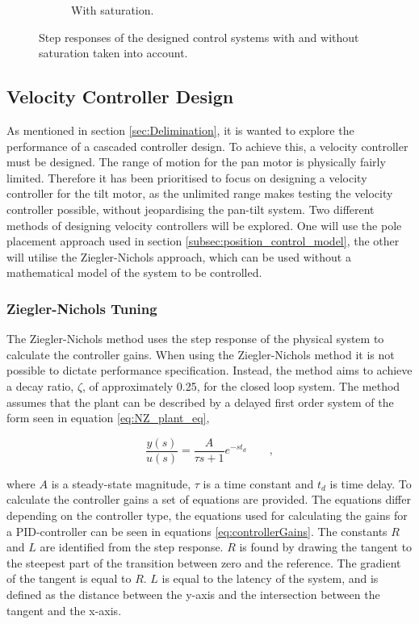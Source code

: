 \documentclass[../../main.tex]{subfiles}
\begin{document}
\begin{figure}[h]
\begin{subfigure}{0.48\textwidth}
    \caption{With saturation.}
    \label{fig:PosStepNoSat}
\end{subfigure}
\caption{Step responses of the designed control systems with and without saturation taken into account.}
\label{fig:PosStep}
\end{figure}


\subsection{Velocity Controller Design}
As mentioned in section \ref{sec:Delimination}, it is wanted to explore the performance of a cascaded controller design. To achieve this, a velocity controller must be designed. The range of motion for the pan motor is physically fairly limited. Therefore it has been prioritised to focus on designing a velocity controller for the tilt motor, as the unlimited range makes testing the velocity controller possible, without jeopardising the pan-tilt system. Two different methods of designing velocity controllers will be explored. One will use the pole placement approach used in section \ref{subsec:position_control_model}, the other will utilise the Ziegler-Nichols approach, which can be used without a mathematical model of the system to be controlled.

\subsubsection{Ziegler-Nichols Tuning}
The Ziegler-Nichols method uses the step response of the physical system to calculate the controller gains. When using the Ziegler-Nichols method it is not possible to dictate performance specification. Instead, the method aims to achieve a decay ratio, $\zeta$, of approximately 0.25, for the closed loop system. The method assumes that the plant can be described by a delayed first order system of the form seen in equation \ref{eq:NZ_plant_eq},

\begin{equation}
    \frac{y(s)}{u(s)} = \frac{A}{\tau s + 1} e^{-s t_d} \qquad ,
    \label{eq:NZ_plant_eq}
\end{equation}

where $A$ is a steady-state magnitude, $\tau$ is a time constant and $t_{d}$ is time delay.
To calculate the controller gains a set of equations are provided. The equations differ depending on the controller type, the equations used for calculating the gains for a PID-controller can be seen in equations \ref{eq:controllerGains}. The constants $R$ and $L$ are identified from the step response. $R$ is found by drawing the tangent to the steepest part of the transition between zero and the reference. The gradient of the tangent is equal to $R$. $L$ is equal to the latency of the system, and is defined as the distance between the y-axis and the intersection between the tangent and the x-axis. 
\end{document}
